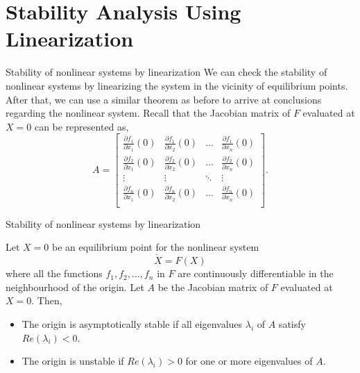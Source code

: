 \documentclass{beamer}
\begin{document}
\section{Stability Analysis Using Linearization}
\begin{frame}{Stability of nonlinear systems by linearization}
    We can check the stability of nonlinear systems by linearizing the system in the vicinity of equilibrium points. After that, we can use a similar theorem as before to arrive at conclusions regarding the nonlinear system. 
    \newline\newline
    Recall that the Jacobian matrix of $F$ evaluated at $X=0$ can be represented as, 
    \[
A = \begin{bmatrix}
    \frac{\partial{f_1}}{\partial{x_1}}(0) & \frac{\partial{f_1}}{\partial{x_2}}(0) & \hdots & \frac{\partial{f_1}}{\partial{x_n}}(0) \\
    \frac{\partial{f_2}}{\partial{x_1}}(0) & \frac{\partial{f_2}}{\partial{x_2}}(0) & \hdots & \frac{\partial{f_2}}{\partial{x_n}}(0) \\
    \vdots & \vdots & \ddots & \vdots \\
    \frac{\partial{f_n}}{\partial{x_1}}(0) & \frac{\partial{f_n}}{\partial{x_2}}(0) & \hdots & \frac{\partial{f_n}}{\partial{x_n}}(0) \\
\end{bmatrix}.
\]
\end{frame}
\begin{frame}{Stability of nonlinear systems by linearization}
    \begin{theorem}\label{t2}
    Let $X=0$ be an equilibrium point for the nonlinear system
    $$\dot{X}=F(X)$$
    where all the functions $f_1,f_2,\dots,f_n$ in $F$ are continuously differentiable in the neighbourhood of the origin. Let $A$ be the Jacobian matrix of $F$ evaluated at $X=0.$
    Then, 
    \begin{itemize}
        \item The origin is asymptotically stable if all eigenvalues $\lambda_i$ of $A$ satisfy $Re(\lambda_i)<0.$
        \item The origin is unstable if $Re(\lambda_i)>0$ for one or more eigenvalues of $A.$
    \end{itemize}
\end{theorem}
\end{frame}
\end{document}
